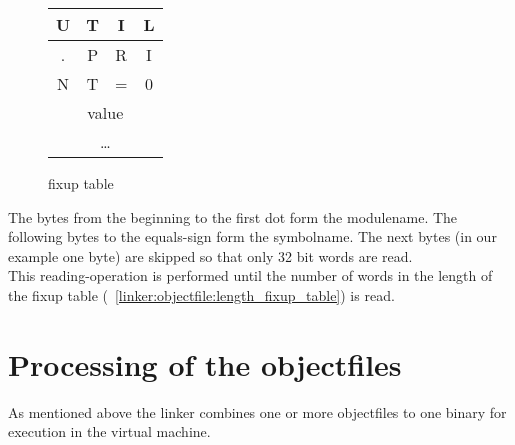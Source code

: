 \begin{figure}[h]
		
	\begin{center}
		\begin{tabular}{|c|c|c|c|}
			\hline
			U & T & I & L \\
			\hline
			. & P & R & I \\
			\hline
			N & T & = & 0 \\
			\hline 
			\multicolumn{4}{|c|}{value} \\
			\hline
			\multicolumn{4}{|c|}{\ldots} \\
			\hline
		\end{tabular}
	\end{center}
	
	\caption{fixup table}
	\label{linker:objectfile:example:fixup_table}
\end{figure}
The bytes from the beginning to the first dot form the modulename. The following
bytes to the equals-sign form the symbolname. The next bytes (in our example one
byte) are skipped so that only 32 bit words are read. \\
This reading-operation is performed until the number of words in the length of
the fixup table (~\ref{linker:objectfile:length_fixup_table}) is read.

\section{Processing of the objectfiles}
\label{linker:objectfile_procession}
As mentioned above the linker combines one or more objectfiles to one binary for
execution in the virtual machine.\\ 

